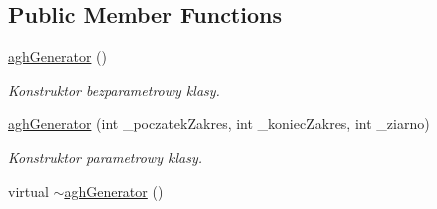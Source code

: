 \subsection*{\-Public \-Member \-Functions}
\begin{DoxyCompactItemize}
\item 
\hypertarget{classaghGenerator_a1c8a018e7ad4193ee039187236c0b6f5}{\hyperlink{classaghGenerator_a1c8a018e7ad4193ee039187236c0b6f5}{agh\-Generator} ()}\label{classaghGenerator_a1c8a018e7ad4193ee039187236c0b6f5}

\begin{DoxyCompactList}\small\item\em \-Konstruktor bezparametrowy klasy. \end{DoxyCompactList}\item 
\hyperlink{classaghGenerator_a069ae40df247e8148cdfa50f48fdc73f}{agh\-Generator} (int \-\_\-poczatek\-Zakres, int \-\_\-koniec\-Zakres, int \-\_\-ziarno)
\begin{DoxyCompactList}\small\item\em \-Konstruktor parametrowy klasy. \end{DoxyCompactList}\item 
\hypertarget{classaghGenerator_a65f76f90a98b2bd4a7e4fe57281e71ca}{virtual \hyperlink{classaghGenerator_a65f76f90a98b2bd4a7e4fe57281e71ca}{$\sim$agh\-Generator} ()}\label{classaghGenerator_a65f76f90a98b2bd4a7e4fe57281e71ca}


\end{DoxyCompactItemize}
